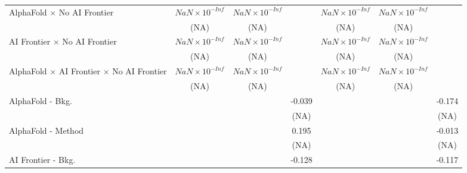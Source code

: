 \begin{tabular}{lcccccc}
   AlphaFold $\times$ No AI Frontier                                          & $NaN\times 10^{-Inf}$  & $NaN\times 10^{-Inf}$  &                        & $NaN\times 10^{-Inf}$  & $NaN\times 10^{-Inf}$  &   \\   
                                                                              & (NA)                   & (NA)                   &                        & (NA)                   & (NA)                   &   \\   
   AI Frontier $\times$ No AI Frontier                                        & $NaN\times 10^{-Inf}$  & $NaN\times 10^{-Inf}$  &                        & $NaN\times 10^{-Inf}$  & $NaN\times 10^{-Inf}$  &   \\   
                                                                              & (NA)                   & (NA)                   &                        & (NA)                   & (NA)                   &   \\   
   AlphaFold $\times$ AI Frontier $\times$ No AI Frontier                     & $NaN\times 10^{-Inf}$  & $NaN\times 10^{-Inf}$  &                        & $NaN\times 10^{-Inf}$  & $NaN\times 10^{-Inf}$  &   \\   
                                                                              & (NA)                   & (NA)                   &                        & (NA)                   & (NA)                   &   \\   
   AlphaFold - Bkg.                                                           &                        &                        & -0.039                 &                        &                        & -0.174\\   
                                                                              &                        &                        & (NA)                   &                        &                        & (NA)\\   
   AlphaFold - Method                                                         &                        &                        & 0.195                  &                        &                        & -0.013\\   
                                                                              &                        &                        & (NA)                   &                        &                        & (NA)\\   
   AI Frontier - Bkg.                                                         &                        &                        & -0.128                 &                        &                        & -0.117\\   

\end{tabular}
